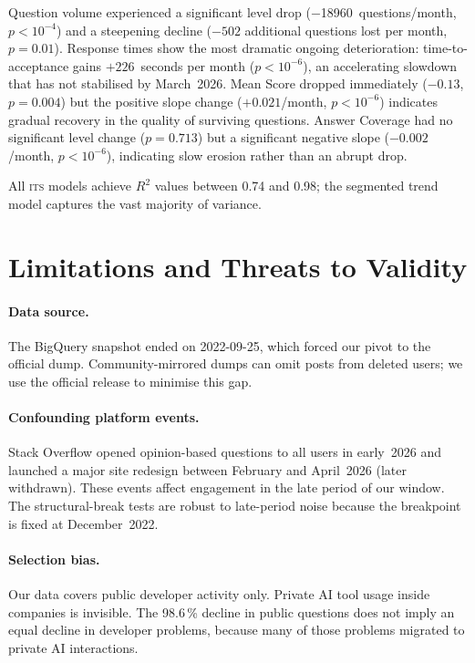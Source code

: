\documentclass[sigconf]{acmart}
\begin{document}
Question volume experienced a significant
level drop ($-$\num{18960}~questions/month,
$p < 10^{-4}$) and a steepening decline
($-502$ additional questions lost per month,
$p = 0.01$).
Response times show the most dramatic
ongoing deterioration:
time-to-acceptance gains
$+226$~seconds per month
($p < 10^{-6}$),
an accelerating slowdown
that has not stabilised
by March~2026.
Mean Score dropped immediately
($-0.13$, $p = 0.004$)
but the positive slope change
($+0.021$/month, $p < 10^{-6}$)
indicates gradual recovery in
the quality of surviving questions.
Answer Coverage had no significant
level change ($p = 0.713$)
but a significant negative slope
($-0.002$/month, $p < 10^{-6}$),
indicating slow erosion
rather than an abrupt drop.

All \textsc{its} models achieve
$R^2$ values between 0.74 and 0.98;
the segmented trend model captures
the vast majority of variance.

\section{Limitations and Threats to Validity}
\label{sec:limitations}

\paragraph{Data source.}
The BigQuery snapshot ended on 2022-09-25,
which forced our pivot to the official dump.
Community-mirrored dumps
can omit posts from deleted users;
we use the official release
to minimise this gap.

\paragraph{Confounding platform events.}
Stack Overflow opened opinion-based questions
to all users in early~2026
and launched a major site redesign
between February and April~2026
(later withdrawn).
These events affect engagement
in the late period of our window.
The structural-break tests
are robust to late-period noise
because the breakpoint is fixed
at December~2022.

\paragraph{Selection bias.}
Our data covers public developer activity only.
Private AI tool usage inside companies
is invisible.
The 98.6\,\% decline in public questions
does not imply an equal decline
in developer problems,
because many of those problems
migrated to private AI interactions.
\end{document}
